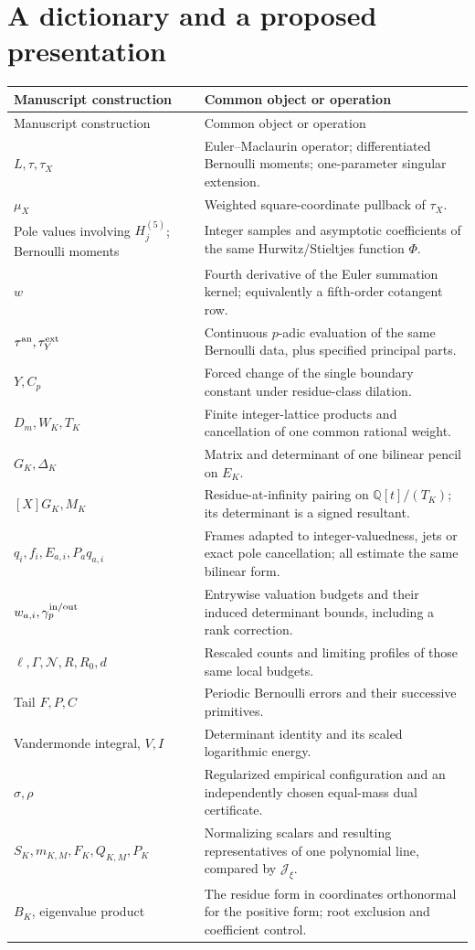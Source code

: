 \documentclass[11pt]{article}
\theoremstyle{definition}
\theoremstyle{remark}\newtheorem*{remark}{Remark}
\newcommand{\Q}{\mathbb Q}
\begin{document}
\section{A dictionary and a proposed presentation}

\begin{longtable}{>{\raggedright\arraybackslash}p{}>{\raggedright\arraybackslash}p{}}
\toprule
Manuscript construction & Common object or operation\\ \midrule
\endfirsthead
\toprule Manuscript construction & Common object or operation\\ \midrule
\endhead
$L,\tau,\tau_X$ & Euler--Maclaurin operator; differentiated Bernoulli moments;
one-parameter singular extension.\\[4pt]
$\mu_X$ & Weighted square-coordinate pullback of $\tau_X$.\\[4pt]
Pole values involving $H_j^{(5)}$; Bernoulli moments & Integer samples and asymptotic coefficients
of the same Hurwitz/Stieltjes function $\Phi$.\\[4pt]
$w$ & Fourth derivative of the Euler summation kernel; equivalently a
fifth-order cotangent row.\\[4pt]
$\tau^{\rm an},\tau_Y^{\rm ext}$ & Continuous $p$-adic evaluation of the same
Bernoulli data, plus specified principal parts.\\[4pt]
$Y,C_p$ & Forced change of the single boundary constant under residue-class
dilation.\\[4pt]
$D_m,W_K,T_K$ & Finite integer-lattice products and cancellation of one common
rational weight.\\[4pt]
$G_K,\Delta_K$ & Matrix and determinant of one bilinear pencil on $E_K$.\\[4pt]
$[X]G_K,M_K$ & Residue-at-infinity pairing on $\Q[t]/(T_K)$; its determinant is
a signed resultant.\\[4pt]
$q_i,f_i,E_{a,i},P_aq_{a,i}$ & Frames adapted to integer-valuedness, jets or exact
pole cancellation; all estimate the same bilinear form.\\[4pt]
$w_{a,i},\gamma_p^{\rm in/out}$ & Entrywise valuation budgets and their induced
determinant bounds, including a rank correction.\\[4pt]
$\ell,\Gamma,\mathcal N,R,R_0,d$ & Rescaled counts and limiting profiles of those
same local budgets.\\[4pt]
Tail $F,P,C$ & Periodic Bernoulli errors and their successive primitives.\\[4pt]
Vandermonde integral, $V,I$ & Determinant identity and its scaled logarithmic
energy.\\[4pt]
$\sigma,\rho$ & Regularized empirical configuration and an independently chosen
equal-mass dual certificate.\\[4pt]
$S_K,m_{K,M},F_K,Q_{K,M},P_K$ & Normalizing scalars and resulting representatives
of one polynomial line, compared by $\mathcal J_\xi$.\\[4pt]
$B_K$, eigenvalue product & The residue form in coordinates orthonormal for the
positive form; root exclusion and coefficient control.\\
\bottomrule
\end{longtable}
\end{document}
